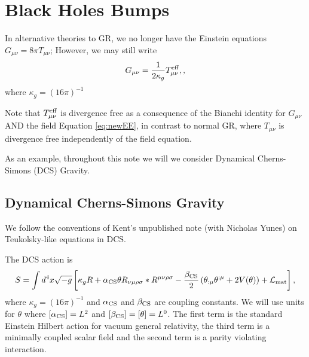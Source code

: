 \documentclass[aps,prd,amsmath,showpacs,amssymb,superscriptaddress,nofootinbib,longbibliography,eqsecnum,preprintnumbers]{revtex4-1}
\newcommand{\acs}{\alpha_{\rm CS}}
\newcommand{\bcs}{\beta_{\rm CS}}
\begin{document}
\section{Black Holes Bumps}
In alternative theories to GR, we no longer have the Einstein equations $G_{\mu \nu}=8\pi T_{\mu \nu}$; However, we may still write
\begin{align}
G_{\mu\nu}=\frac{1}{2\kappa_g}T^{\rm eff}_{\mu\nu}, \label{eq:newEE},
\end{align}
where $\kappa_g=(16\pi)^{-1}$

Note that $T^{\rm eff}_{\mu\nu}$ is divergence free as a consequence of the Bianchi identity for $G_{\mu\nu}$ AND the field Equation \eqref{eq:newEE}, in contrast to normal GR, where $T_{\mu\nu}$ is divergence free independently of the field equation.

As an example, throughout this note we will we consider Dynamical Cherns-Simons (DCS) Gravity. 
\subsection{Dynamical Cherns-Simons Gravity}

We follow the conventions of Kent's unpublished note (with Nicholas Yunes) on Teukolsky-like equations in DCS.

The DCS action is
\begin{align}
S=\int d^4x\sqrt{-g}\left[\kappa_g R+\acs \theta R_{\nu \mu\rho\sigma}*R^{\mu\nu\rho\sigma}-\frac{\bcs}{2}\left(\theta_{:\mu}\theta^{;\mu}+2V(\theta)\right)+\mathcal{L}_{\rm mat}\right],
\end{align}
where $\kappa_{g}=(16\pi)^{-1}$ and $\acs$ and $\bcs$ are coupling constants. We will use units for $\theta$ where $[\acs]=L^2$ and $[\bcs]=[\theta]=L^0$.
The first term is the standard Einstein Hilbert action for vacuum general relativity, the third term is a minimally coupled scalar field and the second term is a parity violating interaction.
\end{document}

